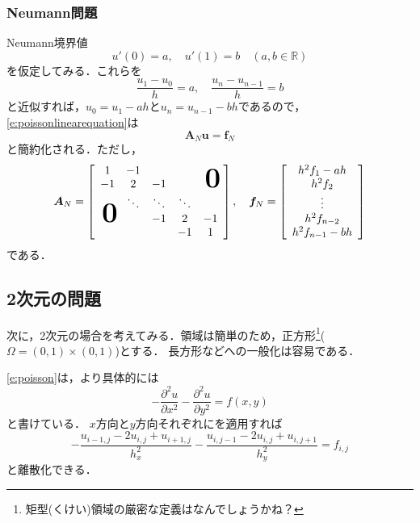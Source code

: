 \subsubsection{Neumann問題}
Neumann境界値
\begin{equation}
\label{e:1dstationaryneumann}
u'(0)=a,\quad u'(1)=b\quad(a,b\in\mathbb{R})
\end{equation}
を仮定してみる．これらを
$$
\frac{u_1-u_0}{h}=a,\quad \frac{u_{n}-u_{n-1}}{h}=b
$$
と近似すれば，$u_0=u_1-ah$と$u_{n}=u_{n-1}-bh$であるので，\eqref{e:poissonlinearequation}は
$$
\bm{A}_N\bm{u}=\bm{f}_N
$$
と簡約化される．ただし，
\begin{equation}
\bm{A}_N=\left[\begin{array}{ccccc}
	1&-1&&&\\
	-1&2&-1&&\hsymb{\bm{0}}\\
	&\ddots&\ddots&\ddots&\\
	\hsymb{\bm{0}}&&-1&2&-1\\
	&&&-1&1
	\end{array}\right],\quad
\bm{f}_N=\left[\begin{array}{c}
	h^2 f_1-ah\\
	h^2 f_2\\
	\vdots\\
	h^2 f_{n-2}\\
	h^2 f_{n-1}-bh
	\end{array}\right]
\end{equation}
である．

\subsection{2次元の問題}
次に，2次元の場合を考えてみる．領域は簡単のため，正方形\footnote{矩型(くけい)領域の厳密な定義はなんでしょうかね？}($\Omega=(0,1)\times(0,1)$)とする．
長方形などへの一般化は容易である．

\eqref{e:poisson}は，より具体的には
$$
-\frac{\partial^2u}{\partial x^2}-\frac{\partial^2u}{\partial y^2}=f(x,y)
$$
と書けている．
$x$方向と$y$方向それぞれにを適用すれば
$$
-\frac{u_{i-1,j}-2u_{i,j}+u_{i+1,j}}{h_x^2}-\frac{u_{i,j-1}-2u_{i,j}+u_{i,j+1}}{h_y^2}=f_{i,j}
$$
と離散化できる．
%



